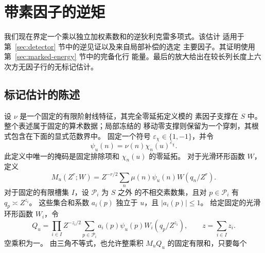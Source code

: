 \documentclass[11pt,a4paper]{article}
\numberwithin{equation}{section}
\numberwithin{figure}{section}
\theoremstyle{definition}
\theoremstyle{remark}
\begin{document}
\section{带素因子的逆矩}\label{sec:inverse}

我们现在界定一个乘以独立加权素数和的逆狄利克雷多项式。该估计
适用于第~\ref{sec:detector} 节中的逆见证以及来自局部补偿的选定
主要因子。其证明使用第~\ref{sec:marked-energy} 节中的完备化行
能量。最后的放大给出在较长列长度上六次方无因子行的无标记估计。

\subsection{标记估计的陈述}

设 \(\nu\) 是一个固定的有限阶射线特征，其完全零延拓定义模的
素因子支撑在 \(S\) 中。整个表述属于固定的算术数据；局部冻结的
移动零支撑则保留为一个穿刺，其根式包含在下面的显式范数界中。
固定一个符号 \(\varepsilon_\chi\in\{1,-1\}\)，并令
\[
 \psi_u(n)=\nu(n)\chi_n(u)^{\varepsilon_\chi}.
\]
此定义中唯一的掩码是固定排除项和 \(\chi_n(u)\) 的零延拓。
对于光滑环形函数 \(W\)，定义
\[
 M_u(Z^r;W)=Z^{-r/2}\sum_n\mu(n)\psi_u(n)W(q_n/Z^r).
\]
对于固定的有限槽集 \(I\)，设 \(\mathcal P_i\) 为 \(S\) 之外
的不相交素数集，且对 \(p\in\mathcal P_i\) 有 \(q_p\asymp Z^{z_i}\)。
这些集合和系数 \(a_i(p)\) 独立于 \(u\)，且 \(|a_i(p)|\le1\)。
给定固定的光滑环形函数 \(W_i\)，令
\[
 Q_u=\prod_{i\in I}Z^{-z_i/2}
       \sum_{p\in\mathcal P_i}a_i(p)\psi_u(p)W_i(q_p/Z^{z_i}),
 \qquad z=\sum_{i\in I}z_i.
\]
空乘积为一。
由三角不等式，也允许整乘积 \(M_uQ_u\) 的固定有限和，只要每个
\end{document}
